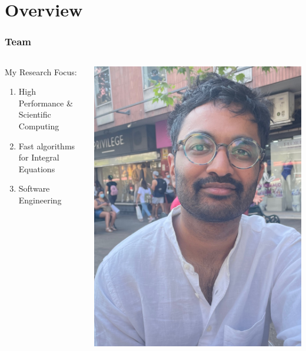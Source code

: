 \section{Overview}

\begin{frame}
    \frametitle{Team}
    \begin{columns}

        \begin{column}{0.5\textwidth}

        My Research Focus:

            \begin{enumerate}
                \item High Performance \& Scientific Computing
                \item Fast algorithms for Integral Equations
                \item Software Engineering
            \end{enumerate}
        \end{column}
        \begin{column}{0.5\textwidth}
             \begin{center}
                 \begin{minipage}{0.48\linewidth}
                    \includegraphics[height=1.2\linewidth]{assets/sri.jpeg}

\end{minipage}
\end{center}
\end{column}
\end{columns}
\end{frame}

